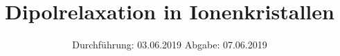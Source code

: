 

\subject{VERSUCH NUMMER 48}
\title{Dipolrelaxation in Ionenkristallen}
\date{
  Durchführung: 03.06.2019
  \hspace{3em}
  Abgabe: 07.06.2019
}



\thispagestyle{empty}
\maketitle
\thispagestyle{empty}
\tableofcontents
\newpage
\setcounter{page}{1}


% 




\nocite{*}
\printbibliography

